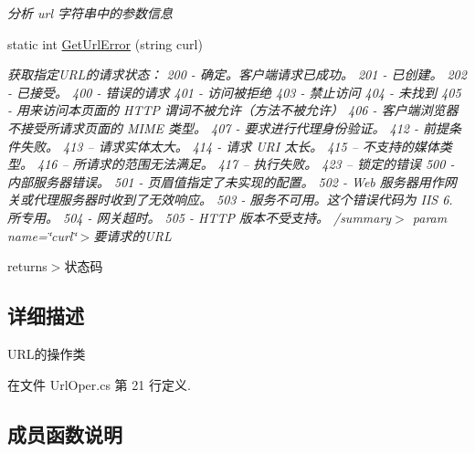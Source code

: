 \begin{DoxyCompactItemize}
\begin{DoxyCompactList}\small\item\em 分析 url 字符串中的参数信息 \end{DoxyCompactList}\item 
static int \hyperlink{class_x_c_l_net_tools_1_1_string_hander_1_1_url_oper_ac5c640bfc662741345164efa1efbc525}{Get\+Url\+Error} (string curl)
\begin{DoxyCompactList}\small\item\em 获取指定\+U\+R\+L的请求状态： 200 -\/ 确定。客户端请求已成功。 201 -\/ 已创建。 202 -\/ 已接受。 400 -\/ 错误的请求 401 -\/ 访问被拒绝 403 -\/ 禁止访问 404 -\/ 未找到 405 -\/ 用来访问本页面的 H\+T\+TP 谓词不被允许（方法不被允许） 406 -\/ 客户端浏览器不接受所请求页面的 M\+I\+ME 类型。 407 -\/ 要求进行代理身份验证。 412 -\/ 前提条件失败。 413 – 请求实体太大。 414 -\/ 请求 U\+RI 太长。 415 – 不支持的媒体类型。 416 – 所请求的范围无法满足。 417 – 执行失败。 423 – 锁定的错误 500 -\/ 内部服务器错误。 501 -\/ 页眉值指定了未实现的配置。 502 -\/ Web 服务器用作网关或代理服务器时收到了无效响应。 503 -\/ 服务不可用。这个错误代码为 I\+IS 6. 所专用。 504 -\/ 网关超时。 505 -\/ H\+T\+TP 版本不受支持。 /summary$>$ param name=\char`\"{}curl\char`\"{}$>$要请求的\+U\+RL

returns$>$状态码\end{DoxyCompactList}\end{DoxyCompactItemize}


\subsection{详细描述}
U\+R\+L的操作类 



在文件 Url\+Oper.\+cs 第 21 行定义.



\subsection{成员函数说明}
